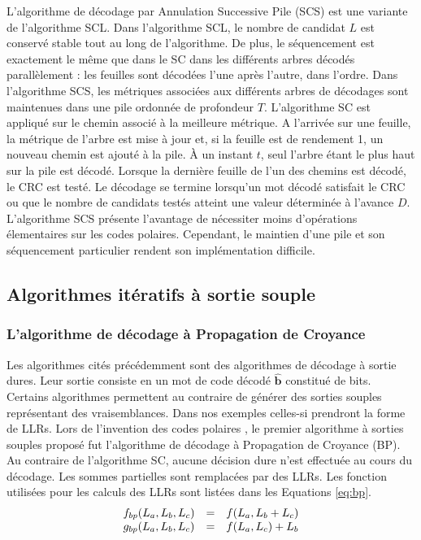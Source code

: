 	L'algorithme de décodage par Annulation Successive Pile (SCS) \cite{chen_improved_2013} est une variante de l'algorithme SCL. Dans l'algorithme SCL, le nombre de candidat $L$ est conservé stable tout au long de l'algorithme. De plus, le séquencement est exactement le même que dans le SC dans les différents arbres décodés parallèlement : les feuilles sont décodées l'une après l'autre, dans l'ordre. Dans l'algorithme SCS, les métriques associées aux différents arbres de décodages sont maintenues dans une pile ordonnée de profondeur $T$. L'algorithme SC est appliqué sur le chemin associé à la meilleure métrique. A l'arrivée sur une feuille, la métrique de l'arbre est mise à jour et, si la feuille est de rendement 1, un nouveau chemin est ajouté à la pile. \`A un instant $t$, seul l'arbre étant le plus haut sur la pile est décodé. Lorsque la dernière feuille de l'un des chemins est décodé, le CRC est testé. Le décodage se termine lorsqu'un mot décodé satisfait le CRC ou que le nombre de candidats testés atteint une valeur déterminée à l'avance $D$. L'algorithme SCS présente l'avantage de nécessiter moins d'opérations élementaires sur les codes polaires. Cependant, le maintien d'une pile et son séquencement particulier rendent son implémentation difficile.


\subsection{Algorithmes itératifs à sortie souple}

\subsubsection{L'algorithme de décodage à Propagation de Croyance}
Les algorithmes cités précédemment sont des algorithmes de décodage à sortie dures. Leur sortie consiste en un mot de code décodé $\mathbold{\hat{b}}$ constitué de bits. Certains algorithmes permettent au contraire de générer des sorties souples représentant des vraisemblances. Dans nos exemples celles-si prendront la forme de LLRs. Lors de l'invention des codes polaires \cite{arikan_channel_2009}, le premier algorithme à sorties souples proposé fut l'algorithme de décodage à Propagation de Croyance (BP). Au contraire de l'algorithme SC, aucune décision dure n'est effectuée au cours du décodage. Les sommes partielles sont remplacées par des LLRs. Les fonction utilisées pour les calculs des LLRs sont listées dans les Equations \ref{eq:bp}.
    \begin{eqnarray}
      \begin{array}{l c l}
        f_{bp}(L_a,L_b,L_c) &=& f(L_a, L_b + L_c) \\
        g_{bp}(L_a,L_b,L_c)&=& f(L_a, L_c) + L_b
      \end{array}
      \label{eq:bp}
    \end{eqnarray}

